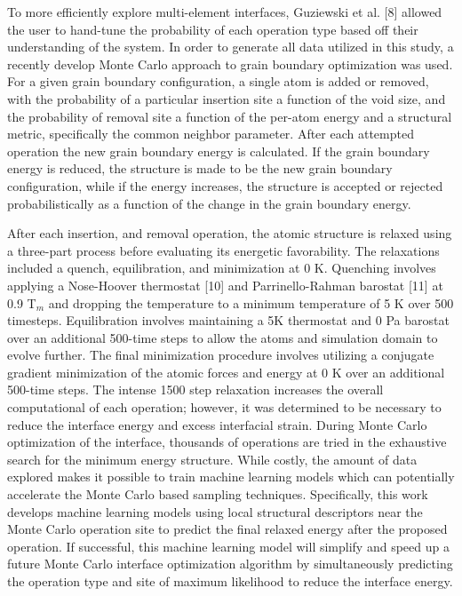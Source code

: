 \documentclass[aip,reprint,longbibliography,amsmath,amssymb,twocolumn,superscriptaddress]{revtex4-1}
\begin{document}
To more efficiently explore multi-element interfaces, Guziewski et al. [8] allowed the user to hand-tune the probability of each operation type based off their understanding of the system. 
%
In order to generate all data utilized in this study, a recently develop Monte Carlo approach to grain boundary optimization was used.  
%
For a given grain boundary configuration, a single atom is added or removed, with the probability of a particular insertion site a function of the void size, and the probability of removal site a function of the per-atom energy and a structural metric, specifically the common neighbor parameter.  
%
After each attempted operation the new grain boundary energy is calculated.  If the grain boundary energy is reduced, the structure is made to be the new grain boundary configuration, while if the energy increases, the structure is accepted or rejected probabilistically as a function of the change in the grain boundary energy.  

After each insertion, and removal operation, the atomic structure is relaxed using a three-part process before evaluating its energetic favorability. 
%
The relaxations included a quench, equilibration, and minimization at 0 K. Quenching involves applying a Nose-Hoover thermostat [10] and Parrinello-Rahman barostat [11] at 0.9 T$_{m}$ and dropping the temperature to a minimum temperature of 5 K over 500 timesteps. 
%
Equilibration involves maintaining a 5K thermostat and 0 Pa barostat over an additional 500-time steps to allow the atoms and simulation domain to evolve further. 
%
The final minimization procedure involves utilizing a conjugate gradient minimization of the atomic forces and energy at 0 K over an additional 500-time steps.  
%
The intense 1500 step relaxation increases the overall computational of each operation; however, it was determined to be necessary to reduce the interface energy and excess interfacial strain.
%
During Monte Carlo optimization of the interface, thousands of operations are tried in the exhaustive search for the minimum energy structure.  
%
While costly, the amount of data explored makes it possible to train machine learning models which can potentially accelerate the Monte Carlo based sampling techniques.  
%
Specifically, this work develops machine learning models using local structural descriptors near the Monte Carlo operation site to predict the final relaxed energy after the proposed operation. 
%
If successful, this machine learning model will simplify and speed up a future Monte Carlo interface optimization algorithm by simultaneously predicting the operation type and site of maximum likelihood to reduce the interface energy.
\end{document}
